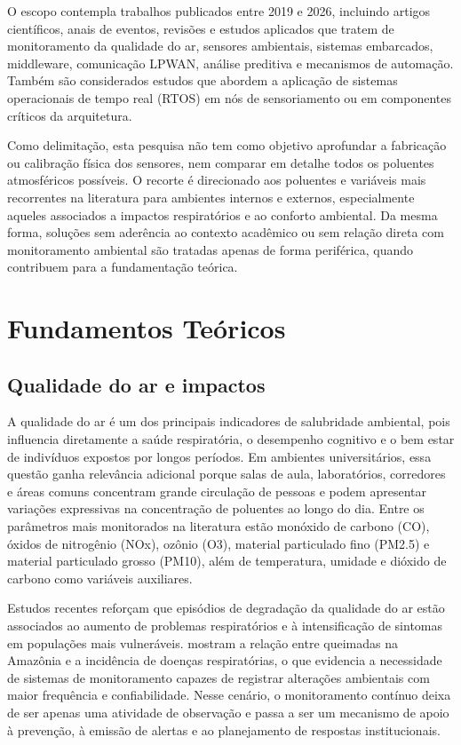 \documentclass[12pt,a4paper]{article}
\begin{document}
O escopo contempla trabalhos publicados entre 2019 e 2026, incluindo artigos científicos, anais de eventos, revisões e estudos aplicados que tratem 
de monitoramento da qualidade do ar, sensores ambientais, sistemas embarcados, middleware, comunicação LPWAN, análise preditiva e mecanismos de automação.
 Também são considerados estudos que abordem a aplicação de sistemas operacionais de tempo real (RTOS) em nós de sensoriamento ou em componentes 
 críticos da arquitetura.

Como delimitação, esta pesquisa não tem como objetivo aprofundar a fabricação ou calibração física dos sensores, nem comparar em detalhe todos os 
poluentes atmosféricos possíveis. O recorte é direcionado aos poluentes e variáveis mais recorrentes na literatura para ambientes internos e externos, 
especialmente aqueles associados a impactos respiratórios e ao conforto ambiental. Da mesma forma, soluções sem aderência ao contexto acadêmico ou
 sem relação direta com monitoramento ambiental são tratadas apenas de forma periférica, quando contribuem para a fundamentação teórica.

\section{Fundamentos Teóricos}
\subsection{Qualidade do ar e impactos}
A qualidade do ar é um dos principais indicadores de salubridade ambiental, pois influencia diretamente a saúde respiratória, o
desempenho cognitivo e o bem estar de indivíduos expostos por longos períodos. Em ambientes universitários, essa questão ganha relevância adicional 
porque salas de aula, laboratórios, corredores e áreas comuns concentram grande circulação de pessoas e podem apresentar variações expressivas 
na concentração de poluentes ao longo do dia. Entre os parâmetros mais monitorados na literatura estão monóxido de carbono (CO), 
óxidos de nitrogênio (NOx), ozônio (O3), material particulado fino (PM2.5) e material particulado grosso (PM10), além de temperatura, 
umidade e dióxido de carbono como variáveis auxiliares.

Estudos recentes reforçam que episódios de degradação da qualidade do ar estão associados ao aumento de problemas respiratórios e à intensificação de 
sintomas em populações mais vulneráveis. \cite{gomes2024} mostram a relação entre queimadas na Amazônia e a incidência de doenças 
respiratórias, o que evidencia a necessidade de sistemas de monitoramento capazes de registrar alterações ambientais com maior frequência e 
confiabilidade. Nesse cenário, o monitoramento contínuo deixa de ser apenas uma atividade de observação e passa a ser um mecanismo de apoio à prevenção, 
à emissão de alertas e ao planejamento de respostas institucionais.
\end{document}
